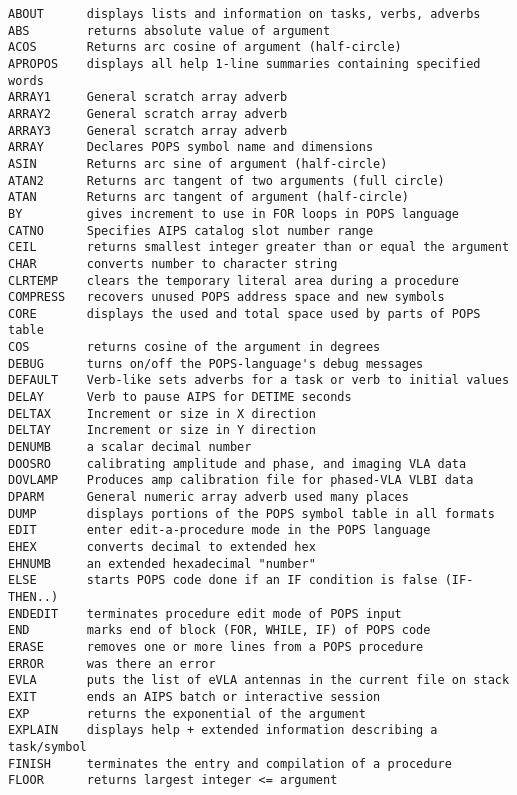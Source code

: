
\vskip 0.5pt
\bbve\begin{verbatim}
ABOUT      displays lists and information on tasks, verbs, adverbs
ABS        returns absolute value of argument
ACOS       Returns arc cosine of argument (half-circle)
APROPOS    displays all help 1-line summaries containing specified words
ARRAY1     General scratch array adverb
ARRAY2     General scratch array adverb
ARRAY3     General scratch array adverb
ARRAY      Declares POPS symbol name and dimensions
ASIN       Returns arc sine of argument (half-circle)
ATAN2      Returns arc tangent of two arguments (full circle)
ATAN       Returns arc tangent of argument (half-circle)
BY         gives increment to use in FOR loops in POPS language
CATNO      Specifies AIPS catalog slot number range
CEIL       returns smallest integer greater than or equal the argument
CHAR       converts number to character string
CLRTEMP    clears the temporary literal area during a procedure
COMPRESS   recovers unused POPS address space and new symbols
CORE       displays the used and total space used by parts of POPS table
COS        returns cosine of the argument in degrees
DEBUG      turns on/off the POPS-language's debug messages
DEFAULT    Verb-like sets adverbs for a task or verb to initial values
DELAY      Verb to pause AIPS for DETIME seconds
DELTAX     Increment or size in X direction
DELTAY     Increment or size in Y direction
DENUMB     a scalar decimal number
DOOSRO     calibrating amplitude and phase, and imaging VLA data
DOVLAMP    Produces amp calibration file for phased-VLA VLBI data
DPARM      General numeric array adverb used many places
DUMP       displays portions of the POPS symbol table in all formats
EDIT       enter edit-a-procedure mode in the POPS language
EHEX       converts decimal to extended hex
EHNUMB     an extended hexadecimal "number"
ELSE       starts POPS code done if an IF condition is false (IF-THEN..)
ENDEDIT    terminates procedure edit mode of POPS input
END        marks end of block (FOR, WHILE, IF) of POPS code
ERASE      removes one or more lines from a POPS procedure
ERROR      was there an error
EVLA       puts the list of eVLA antennas in the current file on stack
EXIT       ends an AIPS batch or interactive session
EXP        returns the exponential of the argument
EXPLAIN    displays help + extended information describing a task/symbol
FINISH     terminates the entry and compilation of a procedure
FLOOR      returns largest integer <= argument

\end{verbatim}
